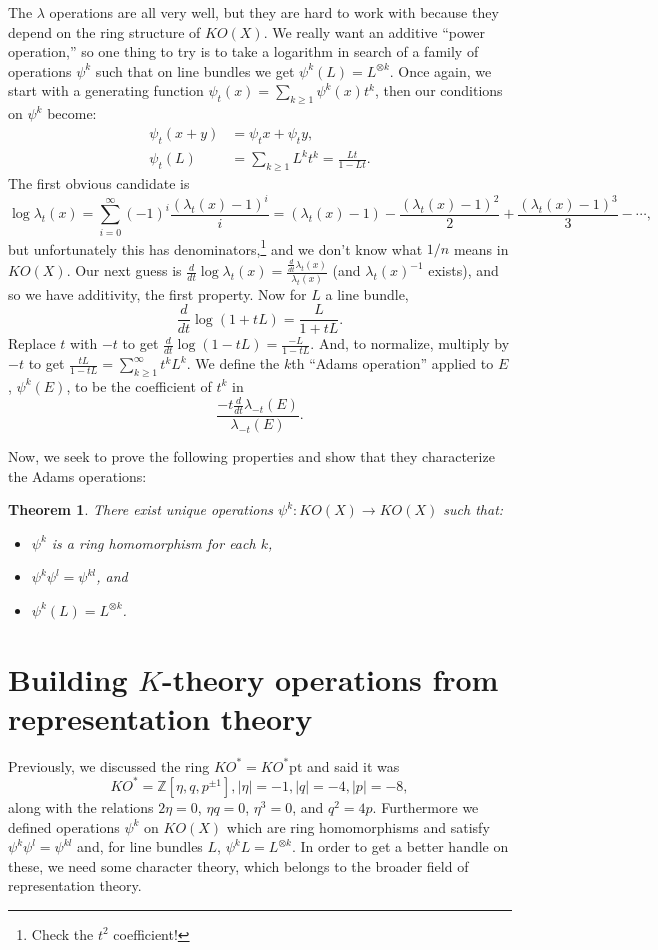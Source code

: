 \documentclass{article}
\providecommand{\OutputBuildingKtheoryOperatorsFromRepTheory}{11}
\newcommand{\Z}{\mathbb{Z}}
\newcommand{\ptspace}{\mathrm{pt}}
\newtheorem{thm}{Theorem}[section]
\begin{document}
The $\lambda$ operations are all very well, but they are hard to work with because they depend on the ring structure of $KO(X)$.  We really want an additive ``power operation,'' so one thing to try is to take a logarithm in search of a family of operations $\psi^k$ such that on line bundles we get $\psi^k(L) = L^{\otimes k}$.  Once again, we start with a generating function $\psi_t(x) = \sum_{k \ge 1} \psi^k(x) t^k$, then our conditions on $\psi^k$ become:
\begin{align*}
\psi_t(x + y) & = \psi_t x + \psi_t y, \\
\psi_t(L) & = \sum_{k \ge 1} L^k t^k = \frac{Lt}{1 - Lt}.
\end{align*}
The first obvious candidate is \[\log \lambda_t(x) = \sum_{i=0}^\infty (-1)^i \frac{(\lambda_t(x) - 1)^i}{i} = (\lambda_t(x) - 1) - \frac{(\lambda_t(x) - 1)^2}{2} + \frac{(\lambda_t(x) - 1)^3}{3} - \cdots,\] but unfortunately this has denominators,\footnote{Check the $t^2$ coefficient!} and we don't know what $1/n$ means in $KO(X)$.  Our next guess is $\frac{d}{dt} \log \lambda_t(x) = \frac{\frac{d}{dt} \lambda_t(x)}{\lambda_t(x)}$ (and $\lambda_t(x)^{-1}$ exists), and so we have additivity, the first property.  Now for $L$ a line bundle,
\[
\frac{d}{dt} \log (1 + tL) = \frac{L}{1 + tL}
.\]
Replace $t$ with $-t$ to get $\frac{d}{dt} \log(1 - tL) = \frac{-L}{1 - tL}$.  And, to normalize, multiply by $-t$ to get $\frac{tL}{1 - tL} = \sum_{k \ge 1}^\infty t^k L^k$.  We define the $k$th ``Adams operation'' applied to $E$, $\psi^k(E)$, to be the coefficient of $t^k$ in \[\frac{-t \frac{d}{dt} \lambda_{-t}(E)}{\lambda_{-t}(E)}.\]

Now, we seek to prove the following properties and show that they characterize the Adams operations:
\begin{thm}
There exist unique operations $\psi^k: KO(X) \to KO(X)$ such that:
\begin{itemize}
\item $\psi^k$ is a ring homomorphism for each $k$,
\item $\psi^k \psi^l = \psi^{kl}$, and
\item $\psi^k(L) = L^{\otimes k}$.
\end{itemize}
\end{thm}

\fi
\section{Building \texorpdfstring{$K$}{K}-theory operations from representation theory} %
\ifx\OutputBuildingKtheoryOperatorsFromRepTheory\undefined\else
Previously, we discussed the ring $KO^* = KO^* \ptspace$ and said it was
\[
KO^* = \Z[\eta, q, p^{\pm 1}], |\eta| = -1, |q| = -4, |p| = -8
,\]
along with the relations $2 \eta = 0$, $\eta q = 0$, $\eta^3 = 0$, and $q^2 = 4p$.  Furthermore we defined operations $\psi^k$ on $KO(X)$ which are ring homomorphisms and satisfy $\psi^k \psi^l = \psi^{kl}$ and, for line bundles $L$, $\psi^k L = L^{\otimes k}$.  In order to get a better handle on these, we need some character theory, which belongs to the broader field of representation theory.
\end{document}
